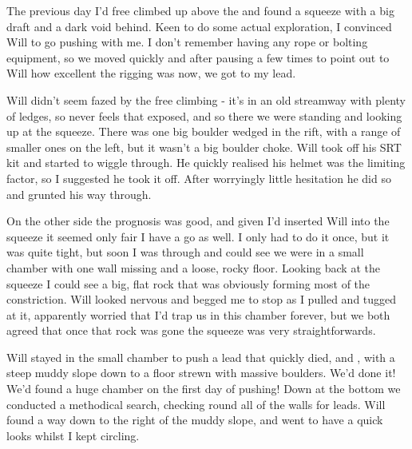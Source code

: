 The previous day I'd free climbed up above the  and found a squeeze with a big draft and a dark void behind. Keen to do some actual exploration, I convinced Will to go pushing with me. I don't remember having any rope or bolting equipment, so we moved quickly and after pausing a few times to point out to Will how excellent the rigging was now, we got to my lead.

Will didn't seem fazed by the free climbing - it's in an old streamway with plenty of ledges, so never feels that exposed, and so there we were standing and looking up at the squeeze. There was one big boulder wedged in the rift, with a range of smaller ones on the left, but it wasn't a big boulder choke. Will took off his SRT kit and started to wiggle through. He quickly realised his helmet was the limiting factor, so I suggested he took it off. After worryingly little hesitation he did so and grunted his way through.

On the other side the prognosis was good, and given I'd inserted Will into the squeeze it seemed only fair I have a go as well. I only had to do it once, but it was quite tight, but soon I was through and could see we were in a small chamber with one wall missing and a loose, rocky floor. Looking back at the squeeze I could see a big, flat rock that was obviously forming most of the constriction. Will looked nervous and begged me to stop as I pulled and tugged at it, apparently worried that I'd trap us in this chamber forever, but we both agreed that once that rock was gone the squeeze was very straightforwards.

Will stayed in the small chamber to push a lead that quickly died, and , with a steep muddy slope down to a floor strewn with massive boulders. We'd done it! We'd found a huge chamber on the first day of pushing! Down at the bottom we conducted a methodical search, checking round all of the walls for leads. Will found a way down to the right of the muddy slope, and went to have a quick looks whilst I kept circling.


